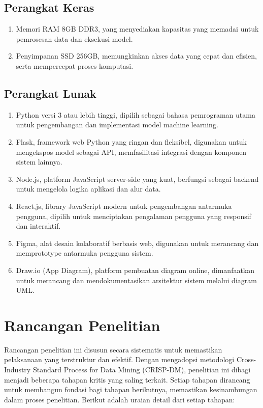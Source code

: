\subsection{Perangkat Keras}
\begin{enumerate}
    \item Memori RAM 8GB DDR3, yang menyediakan kapasitas yang memadai untuk pemrosesan data dan eksekusi model.
    \item Penyimpanan SSD 256GB, memungkinkan akses data yang cepat dan efisien, serta mempercepat proses komputasi.
\end{enumerate}

\subsection{Perangkat Lunak}
\begin{enumerate}
    \item Python versi 3 atau lebih tinggi, dipilih sebagai bahasa pemrograman utama untuk pengembangan dan implementasi model machine learning.
    \item Flask, framework web Python yang ringan dan fleksibel, digunakan untuk mengekspos model sebagai API, memfasilitasi integrasi dengan komponen sistem lainnya.
    \item Node.js, platform JavaScript server-side yang kuat, berfungsi sebagai backend untuk mengelola logika aplikasi dan alur data.
    \item React.js, library JavaScript modern untuk pengembangan antarmuka pengguna, dipilih untuk menciptakan pengalaman pengguna yang responsif dan interaktif.
    \item Figma, alat desain kolaboratif berbasis web, digunakan untuk merancang dan memprototype antarmuka pengguna sistem.
    \item Draw.io (App Diagram), platform pembuatan diagram online, dimanfaatkan untuk merancang dan mendokumentasikan arsitektur sistem melalui diagram UML.
\end{enumerate}

\section{Rancangan Penelitian}
Rancangan penelitian ini disusun secara sistematis untuk memastikan pelaksanaan yang terstruktur dan efektif. Dengan mengadopsi metodologi Cross-Industry Standard Process for Data Mining (CRISP-DM), penelitian ini dibagi menjadi beberapa tahapan kritis yang saling terkait. Setiap tahapan dirancang untuk membangun fondasi bagi tahapan berikutnya, memastikan kesinambungan dalam proses penelitian. Berikut adalah uraian detail dari setiap tahapan:

